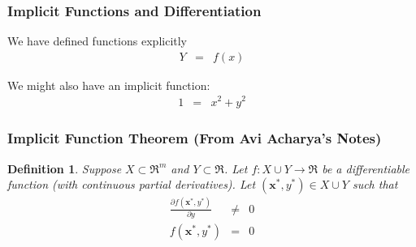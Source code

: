 \documentclass{beamer}
\newtheorem{defn}{Definition}
\numberwithin{equation}{section}
\begin{document}
\begin{frame}
\frametitle{Implicit Functions and Differentiation}


We have defined functions \alert{explicitly}
\begin{eqnarray}
Y & = & f(x) \nonumber 
\end{eqnarray}

We might also have an \alert{implicit} function:
\begin{eqnarray}
1 & = & x^2 + y^2 \nonumber 
\end{eqnarray}


\begin{center}
\end{center}



\end{frame}


\begin{frame}
\frametitle{Implicit Function Theorem (From Avi Acharya's Notes)}

\begin{defn}
Suppose $X \subset \Re^{m} $ and $Y \subset \Re$.  Let $f:X \cup Y \rightarrow \Re$ be a differentiable function (with continuous partial derivatives).  Let $(\boldsymbol{x}^{*}, y^{*} ) \in X \cup Y$ such that 
\begin{eqnarray}
\frac{\partial f(\boldsymbol{x}^{*}, y^{*})}{\partial y } & \neq &  0 \nonumber \\
f(\boldsymbol{x}^{*}, y^{*} ) & = & 0 \nonumber 
\end{eqnarray}

\pause 


\end{defn}

\end{frame}
\end{document}

